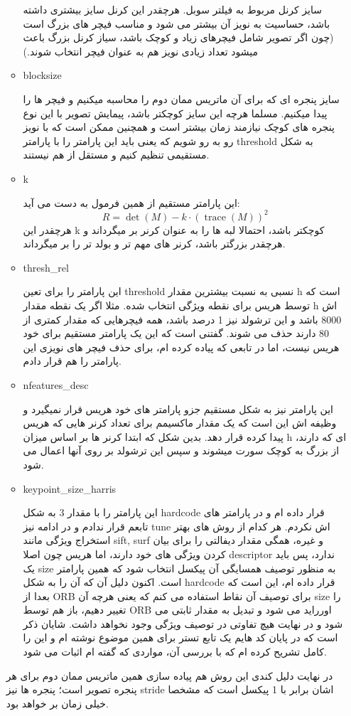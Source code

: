 \documentclass[a4paper,12pt]{article}
\begin{document}
\begin{enumerate}
\begin{itemize}
		سایز کرنل مربوط به فیلتر سوبل. هرچقدر این کرنل سایز بیشتری داشته باشد، حساسیت به نویز آن بیشتر می شود و مناسب فیچر های بزرگ است (چون اگر تصویر شامل فیچرهای زیاد و کوچک باشد، سیاز کرنل بزرگ باعث میشود تعداد زیادی نویز هم به عنوان فیچر انتخاب شوند.)
		\item blocksize
		
		سایز پنجره ای که برای آن ماتریس ممان دوم را محاسبه میکنیم و فیچر ها را پیدا میکنیم. مسلما هرچه این سایز کوچکتر باشد، پیمایش تصویر با این نوع پنجره های کوچک نیازمند زمان بیشتر است و همچنین ممکن است که با نویز رو به رو شویم که یعنی باید این پارامتر را با پارامتر threshold به شکل مستقیمی تنظیم کنیم و مستقل از هم نیستند.
		
		\item k
		
		این پارامتر مستقیم از همین فرمول به دست می آید:
		\[
		R = \det(M) - k \cdot (\operatorname{trace}(M))^2
		\]
		هرچقدر این k کوچکتر باشد، احتمالا لبه ها را به عنوان کرنر بر میگرداند و هرچقدر بزرگتر باشد، کرنر های مهم تر و بولد تر را بر میگرداند.
		
		\item thresh\_rel
		
		این پارامتر را برای تعین threshold نسبی به نسبت بیشترین مقدار h است که توسط هریس برای نقطه ویژگی انتخاب شده. مثلا اگر یک نقطه مقدار h اش 8000 باشد و این ترشولد نیز 1 درصد باشد، همه فیچرهایی که مقدار کمتری از 80 دارند حذف می شوند. گفتنی است که این یک پارامتر مستقیم برای خود هریس نیست، اما در تابعی که پیاده کرده ام، برای حذف فیچر های نویزی این پارامتر را هم قرار دادم.
		
		\item nfeatures\_desc
		
		این پارامتر نیز به شکل مستقیم جزو پارامتر های خود هریس قرار نمیگیرد و وظیفه اش این است که یک مقدار ماکسیمم برای تعداد کرنر هایی که هریس پیدا کرده قرار دهد. بدین شکل که ابتدا کرنر ها بر اساس میزان h ای که دارند، از بزرگ به کوچک سورت میشوند و سپس این ترشولد بر روی آنها اعمال می شود.
		
		\item keypoint\_size\_harris
		
		این پارامتر را با مقدار 3 به شکل hardcode قرار داده ام و در پارامتر های تابعم قرار ندادم و در ادامه نیز tune اش نکردم. هر کدام از روش های بهتر استخراج ویژگی مانند sift, surf و غیره، همگی مقدار دیفالتی را برای بیان کردن ویژگی های خود دارند، اما هریس چون اصلا descriptor ندارد، پس باید یک size به منظور توصیف همسایگی آن پیکسل انتخاب شود که همین پارامتر است. اکنون دلیل آن که آن را به شکل hardcode قرار داده ام، این است که بعدا از ORB برای توصیف آن نقاط استفاده می کنم که یعنی هرچه آن size را تغییر دهیم، باز هم توسط ORB اورراید می شود و تبدیل به مقدار ثابتی می شود و در نهایت هیچ تفاوتی در توصیف ویژگی وجود نخواهد داشت. شایان ذکر است که در پایان کد هایم یک تابع تستر برای همین موضوع نوشته ام و این را کامل تشریح کرده ام که با بررسی آن، مواردی که گفته ام اثبات می شود.
		
	\end{itemize}
	در نهایت دلیل کندی این روش هم پیاده سازی همین ماتریس ممان دوم برای هر پنجره تصویر است؛ پنجره ها نیز stride اشان برابر با 1 پیکسل است که مشخصا خیلی زمان بر خواهد بود.
\end{enumerate}
\end{document}
